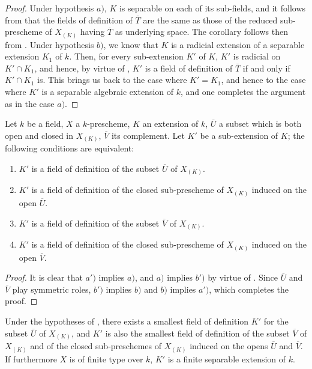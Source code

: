 \begin{proof}
Under hypothesis $a)$, $K$ is separable on each of its sub-fields, and it follows from  that the fields of definition of $\overline{T}$ are the same as those of the reduced sub-prescheme of $X_{(K)}$ having $\overline{T}$ as underlying space.
The corollary follows then from .
Under hypothesis $b)$, we know that $K$ is a radicial extension of a separable extension $K_1$ of $k$.
Then, for every sub-extension $K'$ of $K$, $K'$ is radicial on $K'\cap K_1$, and hence, by virtue of , $K'$ is a field of definition of $\overline{T}$ if and only if $K'\cap K_1$ is.
This brings us back to the case where $K'=K_1$, and hence to the case where $K'$ is a separable algebraic extension of $k$, and one completes the argument as in the case $a)$.
\end{proof}

\begin{proposition}[4.9.6]
\label{IV.4.9.6}
Let $k$ be a field, $X$ a $k$-prescheme, $K$ an extension of $k$, $\overline{U}$ a subset which is both open and closed in $X_{(K)}$, $\overline{V}$ its complement.
Let $K'$ be a sub-extension of $K$; the following conditions are equivalent:
\begin{enumerate}[label=\emph{\alph*)}]
  \item $K'$ is a field of definition of the subset $\overline{U}$ of $X_{(K)}$.
  \item[\emph{a$'$)}] $K'$ is a field of definition of the closed sub-prescheme of $X_{(K)}$ induced on the open $\overline{U}$.
  \item[\emph{b)}] $K'$ is a field of definition of the subset $\overline{V}$ of $X_{(K)}$.
  \item[\emph{b$'$)}] $K'$ is a field of definition of the closed sub-prescheme of $X_{(K)}$ induced on the open $\overline{V}$.
\end{enumerate}
\end{proposition}

\begin{proof}
It is clear that $a')$ implies $a)$, and $a)$ implies $b')$ by virtue of .
Since $\overline{U}$ and $\overline{V}$ play symmetric roles, $b')$ implies $b)$ and $b)$ implies $a')$, which completes the proof.
\end{proof}

\begin{corollary}[4.9.7]
\label{IV.4.9.7}
Under the hypotheses of , there exists a smallest field of definition $K'$ for the subset $\overline{U}$ of $X_{(K)}$, and $K'$ is also the smallest field of definition of the subset $\overline{V}$ of $X_{(K)}$ and of the closed sub-preschemes of $X_{(K)}$ induced on the opens $\overline{U}$ and $\overline{V}$.
If furthermore $X$ is of finite type over $k$, $K'$ is a finite separable extension of $k$.
\end{corollary}

